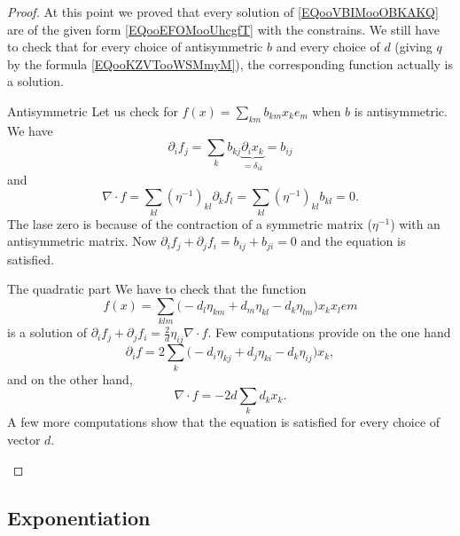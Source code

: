 \begin{proof}
    At this point we proved that every solution of \eqref{EQooVBIMooOBKAKQ} are of the given form \eqref{EQooEFOMooUhcgfT} with the constrains. We still have to check that for every choice of antisymmetric \( b\) and every choice of \( d\) (giving \( q\) by the formula \eqref{EQooKZVTooWSMmyM}), the corresponding function actually is a solution.

    \begin{subproof}
    \item[Antisymmetric]
        Let us check for \( f(x)=\sum_{km}b_{km}x_ke_m\) when \( b\) is antisymmetric. We have
        \begin{equation}
            \partial_if_j=\sum_kb_{kj}\underbrace{\partial_ix_k}_{=\delta_{ik}}=b_{ij}
        \end{equation}
        and
        \begin{equation}
            \nabla\cdot f=\sum_{kl}(\eta^{-1})_{kl}\partial_kf_l=\sum_{kl}(\eta^{-1})_{kl}b_{kl}=0.
        \end{equation}
        The lase zero is because of the contraction of a symmetric matrix (\( \eta^{-1}\)) with an antisymmetric matrix. Now \( \partial_if_j+\partial_jf_i=b_{ij}+b_{ji}=0\) and the equation is satisfied.

    \item[The quadratic part]
        We have to check that the function
        \begin{equation}
            f(x)=\sum_{klm}\big( -d_l\eta_{km}+d_m\eta_{kl}-d_k\eta_{lm} \big)x_kx_lem
        \end{equation}
        is a solution of \( \partial_if_j+\partial_jf_i=\frac{ 2 }{ d }\eta_{ij}\nabla\cdot f\). Few computations provide on the one hand
        \begin{equation}
            \partial_if=2\sum_k\big( -d_i\eta_{kj}+d_j\eta_{ki}-d_k\eta_{ij} \big)x_k,
        \end{equation}
        and on the other hand,
        \begin{equation}
            \nabla\cdot f=-2d\sum_kd_kx_k.
        \end{equation}
        A few more computations show that the equation is satisfied for every choice of vector \( d\).
    \end{subproof}
\end{proof}

\subsection{Exponentiation}


